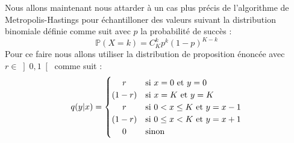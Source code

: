Nous allons maintenant nous attarder à un cas plus précis de l'algorithme de Metropolis-Hastings pour échantilloner des valeurs suivant la 
distribution binomiale définie comme suit avec $p$ la probabilité de succès :
\begin{equation*}
  \mathbb{P}(X = k) = C_K^k p^k(1-p)^{K-k}
\end{equation*}
Pour ce faire nous allons utiliser la distribution de proposition énoncée avec \(r \in \left] 0, 1\right[\) comme suit :
\begin{equation*}
  q(y|x) = 
  \begin{cases}
    \hfil r & \text{si } x = 0 \text{ et } y = 0\\
    \hfil (1-r) &  \text{si } x = K \text{ et } y = K\\
    \hfil r & \text{si } 0 < x \leq K \text{ et } y = x - 1\\
    \hfil (1-r) & \text{si } 0 \leq x < K \text{ et } y = x + 1\\
    \hfil 0 & \text{sinon}
  \end{cases}
\end{equation*}

\subsubsection{}


\subsubsection{}

\subsubsection{}